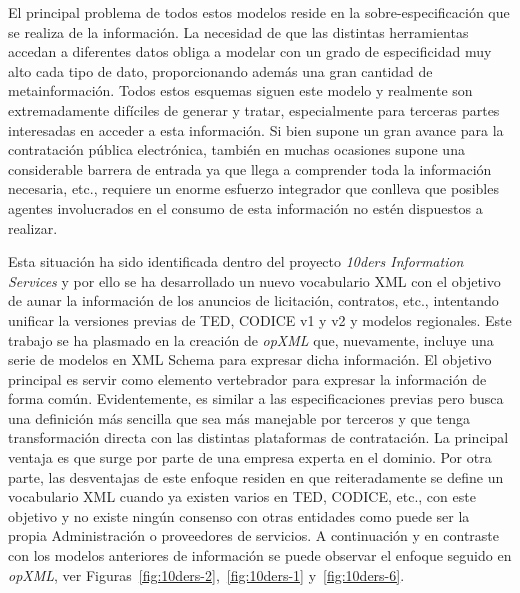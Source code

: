 El principal problema de todos estos modelos reside en la sobre-especificación
que se realiza de la información. La necesidad de que las distintas herramientas accedan
a diferentes datos obliga a modelar con un grado de especificidad muy alto cada tipo de dato, proporcionando
además una gran cantidad de metainformación. Todos estos esquemas siguen este modelo y realmente
son extremadamente difíciles de generar y tratar, especialmente para terceras partes interesadas
en acceder a esta información. Si bien supone un gran avance para la contratación pública electrónica, 
también en muchas ocasiones supone una considerable barrera de entrada ya que llega a comprender toda la información
necesaria, etc., requiere un enorme esfuerzo integrador que conlleva que posibles agentes involucrados
en el consumo de esta información no estén dispuestos a realizar. 

Esta situación ha sido identificada dentro del proyecto \textit{\gls{10ders} Information Services} y por ello
se ha desarrollado un nuevo vocabulario \gls{XML} con el objetivo de aunar la información de los anuncios de licitación,
contratos, etc., intentando unificar la versiones previas de \gls{TED}, \gls{CODICE} v1 y v2 y modelos
regionales. Este trabajo se ha plasmado en la creación de \textit{\gls{opXML}} que, nuevamente, incluye
una serie de modelos en \gls{XML Schema} para expresar dicha información. El objetivo principal
es servir como elemento vertebrador para expresar la información de forma común. Evidentemente,
es similar a las especificaciones previas pero busca una definición más sencilla que sea más manejable
por terceros y que tenga transformación directa con las distintas plataformas de contratación. La principal ventaja
es que surge por parte de una empresa experta en el dominio. Por otra parte, las desventajas
de este enfoque residen en que reiteradamente se define un vocabulario XML cuando ya existen varios en \gls{TED}, CODICE, etc., 
con este objetivo y no existe ningún consenso con otras entidades como puede ser la propia Administración o proveedores
de servicios.  A continuación y en contraste con los modelos anteriores de información se puede observar el 
enfoque seguido en \textit{opXML}, ver Figuras~\ref{fig:10ders-2},~\ref{fig:10ders-1} y~\ref{fig:10ders-6}. 


